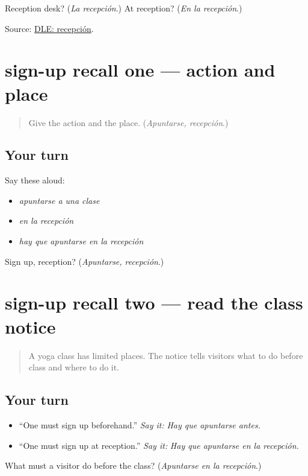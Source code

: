\begin{tcolorbox}[breakable,colback=teal!4,colframe=teal!35!black,title={Before you move on}]
Reception desk? (\emph{La recepción}.) At reception? (\emph{En la recepción}.)

Source: \href{https://dle.rae.es/recepci\%C3\%B3n}{DLE: recepción}.
\end{tcolorbox}
\section[(review)]{sign-up recall one — action and place}

\label{lesson:ES-C414-signup-recall-1}



\begin{quote}
Give the action and the place. (\emph{Apuntarse, recepción}.)
\end{quote}

\subsection*{Your turn}
Say these aloud:

\begin{itemize}
\raggedright
  \item \emph{apuntarse a una clase}
  \item \emph{en la recepción}
  \item \emph{hay que apuntarse en la recepción}
\end{itemize}

\begin{tcolorbox}[breakable,colback=teal!4,colframe=teal!35!black,title={Before you move on}]
Sign up, reception? (\emph{Apuntarse, recepción}.)
\end{tcolorbox}
\section[(review)]{sign-up recall two — read the class notice}

\label{lesson:ES-C414-signup-recall-2}



\begin{quote}
A yoga class has limited places. The notice tells visitors what to do before class and where to do it.
\end{quote}

\subsection*{Your turn}
\begin{itemize}
\raggedright
  \item “One must sign up beforehand.” \emph{Say it:} \emph{Hay que apuntarse antes.}
  \item “One must sign up at reception.” \emph{Say it:} \emph{Hay que apuntarse en la recepción.}
\end{itemize}

\begin{tcolorbox}[breakable,colback=teal!4,colframe=teal!35!black,title={Before you move on}]
What must a visitor do before the class? (\emph{Apuntarse en la recepción}.)
\end{tcolorbox}
